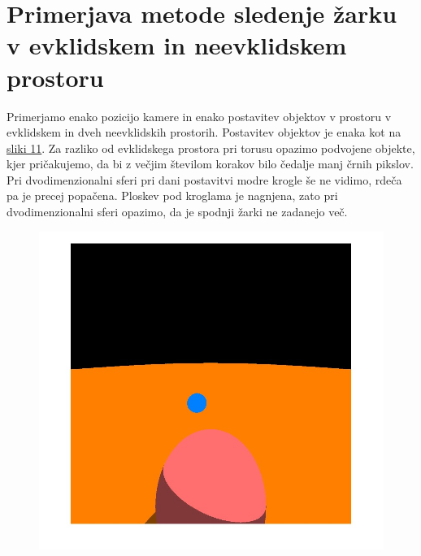 \documentclass[titlepage]{article}
\begin{document}
\section{Primerjava metode sledenje žarku v evklidskem in neevklidskem prostoru}
Primerjamo enako pozicijo kamere in enako postavitev objektov v prostoru v evklidskem in dveh neevklidskih prostorih. Postavitev objektov je enaka kot
na \hyperref[fig:2sphRays2]{sliki 11}. Za razliko od evklidskega prostora pri torusu opazimo podvojene objekte, kjer pričakujemo, da bi z večjim številom korakov bilo čedalje manj črnih pikslov. Pri dvodimenzionalni sferi pri dani postavitvi modre krogle še ne vidimo, rdeča pa je precej popačena. Ploskev pod kroglama je nagnjena, zato pri dvodimenzionalni sferi opazimo, da je spodnji žarki ne zadanejo več.
\begin{figure}[H]
\centering
\begin{minipage}[t]{.33\textwidth}
  \centering
  \includegraphics[width=1\linewidth]{Images/Euclidean.jpg}
  \label{fig:Evklidski prostor render}
\end{minipage}%
\begin{minipage}[t]{.33\textwidth}
  \centering

\end{minipage}
\end{figure}
\end{document}
